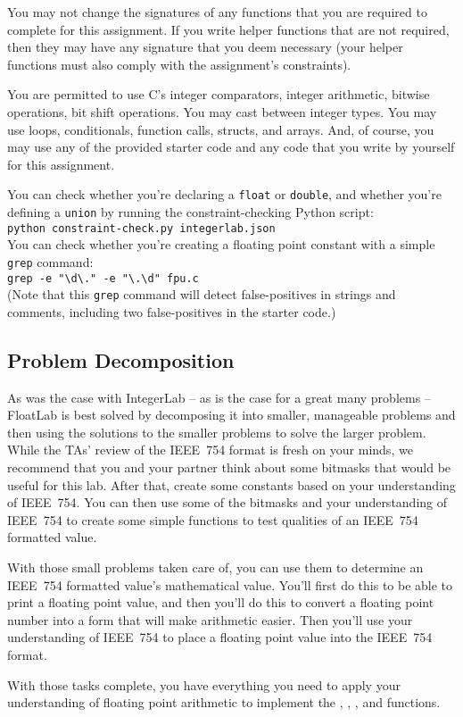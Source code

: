 You may not change the signatures of any functions that you are required to complete for this assignment.
If you write helper functions that are not required, then they may have any signature that you deem necessary
(your helper functions must also comply with the assignment's constraints).

You are permitted to use C's integer comparators, integer arithmetic, bitwise operations, bit shift operations.
You may cast between integer types.
You may use loops, conditionals, function calls, structs, and arrays.
And, of course, you may use any of the provided starter code and any code that you write by yourself for this assignment.

You can check whether you're declaring a \lstinline{float} or \lstinline{double}, and whether you're defining a \lstinline{union} by running the constraint-checking Python script: \\
\texttt{python constraint-check.py integerlab.json} \\
You can check whether you're creating a floating point constant with a simple \texttt{grep} command: \\
\verb#grep -e "\d\." -e "\.\d" fpu.c# \\
(Note that this \texttt{grep} command will detect false-positives in strings and comments, including two false-positives in the starter code.)

\subsection{Problem Decomposition}
As was the case with IntegerLab -- as is the case for a great many problems -- FloatLab is best solved by decomposing it into smaller, manageable problems and then using the solutions to the smaller problems to solve the larger problem.
While the TAs' review of the IEEE~754 format is fresh on your minds, we recommend that you and your partner think about some bitmasks that would be useful for this lab.
After that, create some constants based on your understanding of IEEE~754.
You can then use some of the bitmasks and your understanding of IEEE~754 to create some simple functions to test qualities of an IEEE~754 formatted value.

With those small problems taken care of, you can use them to determine an IEEE~754 formatted value's mathematical value.
You'll first do this to be able to print a floating point value, and then you'll do this to convert a floating point number into a form that will make arithmetic easier.
Then you'll use your understanding of IEEE~754 to place a floating point value into the IEEE~754 format.

With those tasks complete, you have everything you need to apply your understanding of floating point arithmetic to implement the , , , and  functions.
